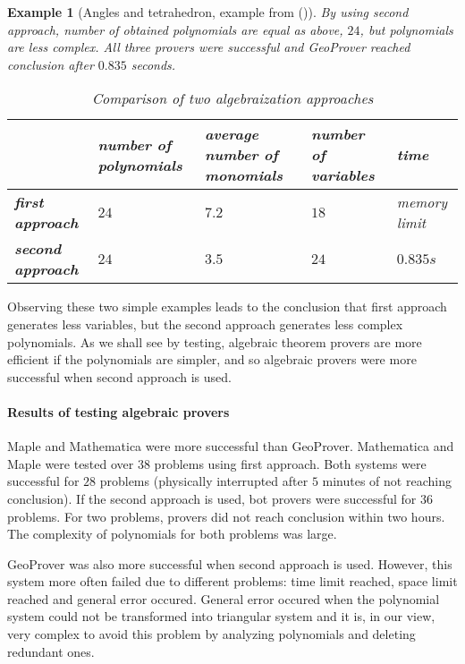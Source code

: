 \documentclass[final,1p,times,authoryear]{elsarticle}
\newtheorem{example}[theorem]{Example}
\begin{document}
\begin{example}[Angles and tetrahedron, example from (\cite{shao2016challenging})]
By using second approach, number of obtained polynomials are equal as
above, $24$, but polynomials are less complex. All three provers were
successful and GeoProver reached conclusion after $0.835$ seconds.

\begin{table}[!hb]
\begin{center}
\begin{tabular}{L{2cm}||R{2cm}|R{2cm}|R{2cm}|R{1.5cm}}
\                   &  number of polynomials & average number of monomials & number of variables & time \\
\hline
\hline
\textbf{first approach} & $24$ & $7.2$ & $18$ & \emph{memory limit} \\
\hline
\textbf{second approach} & $24$ & $3.5$ & $24$ & $0.835s$
\end{tabular}
\caption{Comparison of two algebraization approaches}
\end{center}
\end{table}
\end{example}

Observing these two simple examples leads to the conclusion that first
approach generates less variables, but the second approach generates
less complex polynomials. As we shall see by testing, algebraic
theorem provers are more efficient if the polynomials are simpler, and
so algebraic provers were more successful when second approach is
used.

\paragraph{Results of testing algebraic provers}
Maple and Mathematica were more successful than GeoProver. Mathematica
and Maple were tested over $38$ problems using first approach. Both
systems were successful for $28$ problems (physically interrupted
after $5$ minutes of not reaching conclusion). If the second approach
is used, bot provers were successful for $36$ problems. For two
problems, provers did not reach conclusion within two hours. The
complexity of polynomials for both problems was large.

GeoProver was also more successful when second approach is
used. However, this system more often failed due to different
problems: time limit reached, space limit reached and general error
occured. General error occured when the polynomial system could not be
transformed into triangular system and it is, in our view, very
complex to avoid this problem by analyzing polynomials and deleting
redundant ones.
\end{document}
